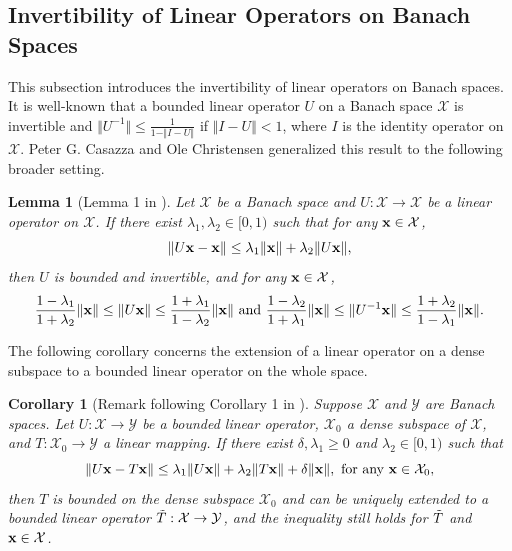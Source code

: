 \documentclass{amsart}
\numberwithin{equation}{section}
\theoremstyle{plain}
\newtheorem{lemma}[theorem]{Lemma}
\newtheorem{corollary}[theorem]{Corollary}
\theoremstyle{definition}
\begin{document}
\subsection{Invertibility of Linear Operators on Banach Spaces} This subsection introduces the invertibility of linear operators on Banach spaces.  It is well-known that a bounded linear operator $U$ on a Banach space $\mathcal{X}$ is invertible and $ \Vert U^{-1} \Vert \leq \frac{1}{1-\Vert I-U \Vert }$ if $\Vert I-U \Vert <1$,
where $I$  is the identity operator on $\mathcal{X}$. Peter G. Casazza and Ole Christensen generalized this result to the following broader setting.
\begin{lemma}[Lemma 1 in \cite{cazassa1997perturbation}]\label{InverseType2}
    Let $\mathcal{X}$ be a Banach space and  $U: \mathcal{X} \rightarrow \mathcal{X} $ be a linear operator on $\mathcal{X}$. If there exist  $\lambda_1, \lambda_2 \in [0,1)$ such that for any ${\bf x} \in \mathcal{X}$, 
    \begin{equation*}
        \Vert U{\bf x} -{\bf x} \Vert \leq \lambda_1 \Vert {\bf x} \Vert + \lambda_2 \Vert U{\bf x} \Vert,
    \end{equation*}
then $U$ is bounded and invertible, and for any ${\bf x} \in \mathcal{X}$, 
\begin{equation*}
    \frac{1-\lambda_1}{1+\lambda_2} \Vert {\bf x} \Vert \leq \Vert U{\bf x} \Vert  \leq \frac{1+\lambda_1}{1-\lambda_2} \Vert {\bf x} \Vert \ \text{and} \ \frac{1-\lambda_2}{1+\lambda_1} \Vert {\bf x} \Vert \leq \Vert U^{-1}{\bf x} \Vert  \leq \frac{1+\lambda_2}{1-\lambda_1} \Vert {\bf x} \Vert.
\end{equation*}
\end{lemma}

The following corollary concerns the extension of a linear operator on a dense subspace to a bounded linear operator on the whole space.

\begin{corollary}[Remark following Corollary 1 in \cite{cazassa1997perturbation}]\label{extension}
   Suppose $\mathcal{X}$ and $\mathcal{Y}$ are Banach spaces. Let $U:\mathcal{X} \rightarrow \mathcal{Y}$ be a bounded linear operator, $\mathcal{X}_0$ a dense subspace of $\mathcal{X}$, and $T:\mathcal{X}_0 \rightarrow \mathcal{Y}$ a linear mapping. If there exist $\delta, \lambda_1 \geq 0 $ and $\lambda_2 \in [0,1)$ such that
    \begin{equation*}
        \Vert U{\bf x} -T{\bf x} \Vert \leq \lambda_1 \Vert U{\bf x} \Vert + \lambda_2 \Vert T{\bf x} \Vert + \delta \Vert {\bf x} \Vert, \ \text{for any ${\bf x} \in \mathcal{X}_0$,}
    \end{equation*}
then $T$ is bounded on the dense subspace $\mathcal{X}_0$ and can be uniquely extended to a bounded linear operator $\Tilde{T}: \mathcal{X} \rightarrow \mathcal{Y}$, and the inequality still holds for $\Tilde{T}$ and ${\bf x} \in \mathcal{X}$.  
\end{corollary}
\end{document}
